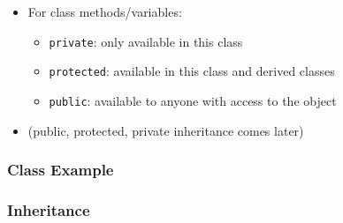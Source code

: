 \begin{itemize}
\itemsep1pt\parskip0pt
\item
  For class methods/variables:

  \begin{itemize}
  \itemsep1pt\parskip0pt
  \item
    \texttt{private}: only available in this class
  \item
    \texttt{protected}: available in this class and derived classes
  \item
    \texttt{public}: available to anyone with access to the object
  \end{itemize}
\item
  (public, protected, private inheritance comes later)
\end{itemize}

\subsubsection{Class Example}\label{class-example-1}

\begin{Shaded}
\begin{Highlighting}[]
 

\NormalTok{: }
      


   \NormalTok{;}
   \NormalTok{;}

   \NormalTok{+(} 

\NormalTok{: }
   
   
\NormalTok{\};}
\end{Highlighting}
\end{Shaded}

\subsubsection{Inheritance}\label{inheritance}


